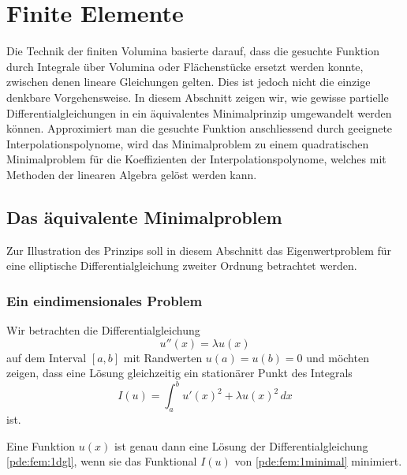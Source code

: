 %
%
%
\section{Finite Elemente
\label{section:finite-elemente}}
Die Technik der finiten Volumina basierte darauf, dass die gesuchte
Funktion durch Integrale über Volumina oder Flächenstücke ersetzt 
werden konnte, zwischen denen lineare Gleichungen gelten.
Dies ist jedoch nicht die einzige denkbare Vorgehensweise.
In diesem Abschnitt zeigen wir, wie gewisse partielle Differentialgleichungen
in ein äquivalentes Minimalprinzip umgewandelt werden können.
Approximiert man die gesuchte Funktion anschliessend durch geeignete
Interpolationspolynome, wird das Minimalproblem zu einem quadratischen
Minimalproblem für die Koeffizienten der Interpolationspolynome,
welches mit Methoden der linearen Algebra gelöst werden kann.
%

\subsection{Das äquivalente Minimalproblem}
Zur Illustration des Prinzips soll in diesem Abschnitt das Eigenwertproblem
für eine elliptische Differentialgleichung zweiter Ordnung betrachtet werden.

\subsubsection{Ein eindimensionales Problem}
Wir betrachten die Differentialgleichung
\begin{equation}
u''(x) = \lambda u(x)
\label{pde:fem:1dgl}
\end{equation}
auf dem Interval $[a,b]$ mit Randwerten  $u(a)=u(b)=0$
und möchten zeigen, dass eine Lösung gleichzeitig ein stationärer
Punkt des Integrals
\begin{equation}
I(u)
=
\int_a^b u'(x)^2 + \lambda u(x)^2 \,dx
\label{pde:fem:1minimal}
\end{equation}
ist.

\begin{satz}
\label{pde:satz:minimal1}
Eine Funktion $u(x)$ ist genau dann eine Lösung der Differentialgleichung
\eqref{pde:fem:1dgl}, wenn sie das Funktional
$I(u)$ von \eqref{pde:fem:1minimal} minimiert.
\end{satz}
%
%

